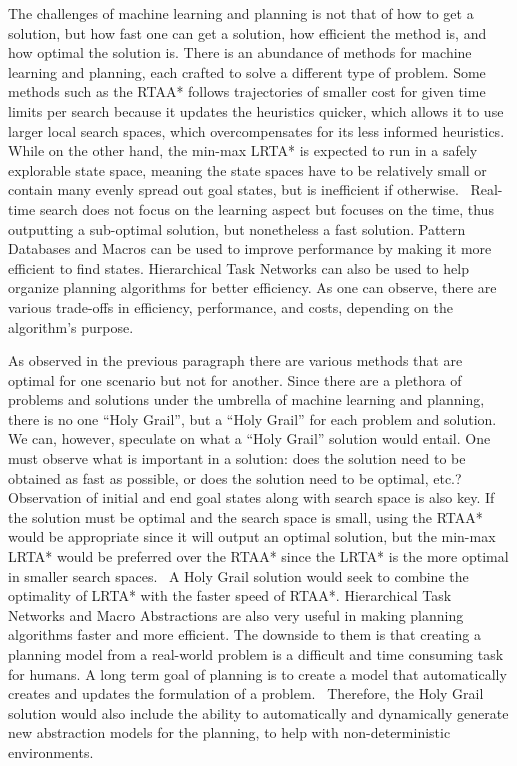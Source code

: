 \documentclass[tog]{acmsiggraph}
\begin{document}
The challenges of machine learning and planning is not that of how to
get a solution, but how fast one can get a solution, how efficient the
method is, and how optimal the solution is. There is an abundance of
methods for machine learning and planning, each crafted to solve a
different type of problem. Some methods such as the RTAA* follows
trajectories of smaller cost for given time limits per search because
it updates the heuristics quicker, which allows it to use larger local
search spaces, which overcompensates for its less informed heuristics.~\cite{koenig2006real}
While on the other hand, the min-max LRTA* is expected to run in a
safely explorable state space, meaning the state spaces have to be
relatively small or contain many evenly spread out goal states, but is
inefficient if otherwise.~\cite{koenig1995real} Real-time search does not focus on the
learning aspect but focuses on the time, thus outputting a sub-optimal
solution, but nonetheless a fast solution. Pattern Databases and
Macros can be used to improve performance by making it more efficient
to find states. Hierarchical Task Networks can also be used to help
organize planning algorithms for better efficiency. As one can
observe, there are various trade-offs in efficiency, performance, and
costs, depending on the algorithm's purpose.

As observed in the previous paragraph there are various methods that
are optimal for one scenario but not for another. Since there are a
plethora of problems and solutions under the umbrella of machine
learning and planning, there is no one ``Holy Grail'', but a ``Holy
Grail'' for each problem and solution. We can, however, speculate on
what a ``Holy Grail'' solution would entail. One must observe what is
important in a solution: does the solution need to be obtained as fast
as possible, or does the solution need to be optimal, etc.?
Observation of initial and end goal states along with search space is
also key. If the solution must be optimal and the search space is
small, using the RTAA* would be appropriate since it will output an
optimal solution, but the min-max LRTA* would be preferred over the
RTAA* since the LRTA* is the more optimal in smaller search spaces.~\cite{korf1990real} A
Holy Grail solution would seek to combine the optimality of LRTA* with
the faster speed of RTAA*. Hierarchical Task Networks and Macro
Abstractions are also very useful in making planning algorithms faster
and more efficient. The downside to them is that creating a planning
model from a real-world problem is a difficult and time consuming task
for humans. A long term goal of planning is to create a model that
automatically creates and updates the formulation of a problem.~\cite{botea2005macro}
Therefore, the Holy Grail solution would also include the ability to
automatically and dynamically generate new abstraction models for the
planning, to help with non-deterministic environments.
\end{document}
